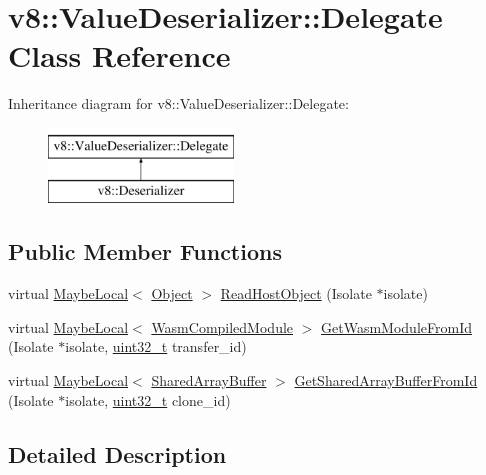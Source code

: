 \hypertarget{classv8_1_1ValueDeserializer_1_1Delegate}{}\section{v8\+:\+:Value\+Deserializer\+:\+:Delegate Class Reference}
\label{classv8_1_1ValueDeserializer_1_1Delegate}
Inheritance diagram for v8\+:\+:Value\+Deserializer\+:\+:Delegate\+:\begin{figure}[H]
\begin{center}
\leavevmode
\includegraphics[height=2.000000cm]{classv8_1_1ValueDeserializer_1_1Delegate}
\end{center}
\end{figure}
\subsection*{Public Member Functions}
\begin{DoxyCompactItemize}
\item 
virtual \mbox{\hyperlink{classv8_1_1MaybeLocal}{Maybe\+Local}}$<$ \mbox{\hyperlink{classv8_1_1Object}{Object}} $>$ \mbox{\hyperlink{classv8_1_1ValueDeserializer_1_1Delegate_a705e325895f76f6cac213b89b505f960}{Read\+Host\+Object}} (Isolate $\ast$isolate)
\item 
virtual \mbox{\hyperlink{classv8_1_1MaybeLocal}{Maybe\+Local}}$<$ \mbox{\hyperlink{classv8_1_1WasmCompiledModule}{Wasm\+Compiled\+Module}} $>$ \mbox{\hyperlink{classv8_1_1ValueDeserializer_1_1Delegate_a23fc01bc6da1da36bf1d555edd493d83}{Get\+Wasm\+Module\+From\+Id}} (Isolate $\ast$isolate, \mbox{\hyperlink{classuint32__t}{uint32\+\_\+t}} transfer\+\_\+id)
\item 
virtual \mbox{\hyperlink{classv8_1_1MaybeLocal}{Maybe\+Local}}$<$ \mbox{\hyperlink{classv8_1_1SharedArrayBuffer}{Shared\+Array\+Buffer}} $>$ \mbox{\hyperlink{classv8_1_1ValueDeserializer_1_1Delegate_afaffdb0ab5dd659ae89377d5e9b6cbf7}{Get\+Shared\+Array\+Buffer\+From\+Id}} (Isolate $\ast$isolate, \mbox{\hyperlink{classuint32__t}{uint32\+\_\+t}} clone\+\_\+id)
\end{DoxyCompactItemize}


\subsection{Detailed Description}


